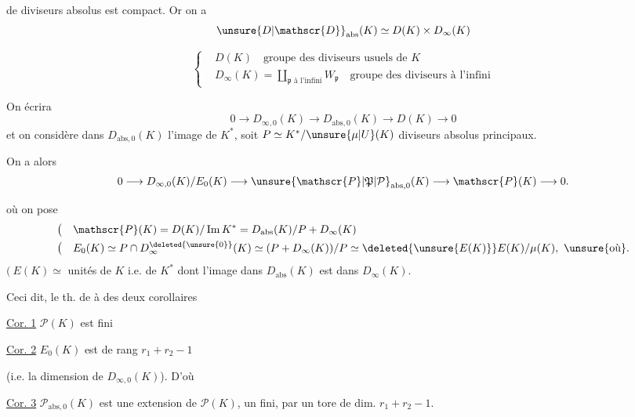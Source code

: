 de diviseurs absolus  est compact. Or on a
\[
{\unsure{D|\mathscr{D}}}_{\mathrm{abs}}(K)\simeq D(K)\times D_\infty(K)
\]

\[
\left\{\begin{aligned}
&D(K)\quad\text{groupe des diviseurs usuels de }K\\
&D_\infty(K)=\coprod_{\mathfrak p\text{ à l'infini}}W_{\mathfrak p}\quad\text{groupe des diviseurs à l'infini}
\end{aligned}\right.
\]

On  écrira
\[
0\longrightarrow D_{\infty,0}(K)\longrightarrow D_{\mathrm{abs},0}(K)\longrightarrow D(K)\longrightarrow0
\]
et on considère dans $D_{\mathrm{abs},0}(K)$ l'image de $K^*$, soit $P\simeq K^*/\unsure{\mu|U}(K)$  diviseurs absolus principaux.

On a alors
\[
0\longrightarrow D_{\infty,0}(K)/E_0(K)\longrightarrow{\unsure{\mathscr{P}|\mathfrak{P}|\mathcal{P}}}_{\mathrm{abs},0}(K)\longrightarrow\mathscr{P}(K)\longrightarrow0.
\]

où on pose
\[
\begin{aligned}
\bigl(\quad&\mathscr{P}(K)=D(K)/\operatorname{Im}K^*=D_{\mathrm{abs}}(K)/P+D_\infty(K)\\
\bigl(\quad&E_0(K)\simeq P\cap D_\infty^{\deleted{\unsure{0}}}(K)\simeq(P+D_\infty(K))/P\simeq\deleted{\unsure{E(K)}}E(K)/\mu(K),\ \text{\unsure{où}}.
\end{aligned}
\]
$\bigl(\ E(K)\simeq$ unités de $K$ i.e.  de $K^*$ dont l'image dans $D_{\mathrm{abs}}(K)$ est dans $D_\infty(K)$.

 Ceci dit, le th. de    à  des deux corollaires

\uline{Cor. 1} $\mathscr{P}(K)$ est fini

\uline{Cor. 2} $E_0(K)$ est de rang $r_1+r_2-1$

(i.e. la dimension de $D_{\infty,0}(K)$). D'où

\uline{Cor. 3} $\mathscr{P}_{\mathrm{abs},0}(K)$ est une extension de $\mathscr{P}(K)$,  un  fini, par un tore de dim. $r_1+r_2-1$.
